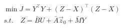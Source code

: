 \documentclass{article}
\begin{document}
\thispagestyle{empty}

$$
\begin{array}{l}
\min J = Y^\top Y + (Z-X)^\top(Z-X)\\
s.t.\quad Z=\bar{B}U + \bar{A}\vec{z}_0 + \bar{M}Y
\end{array}
$$
\end{document}
